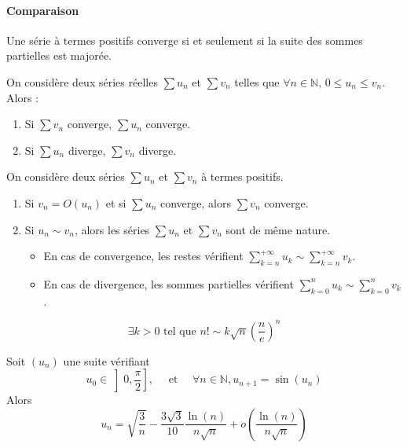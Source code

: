 	\paragraph{Comparaison}

	\begin{proposition}
		Une série à termes positifs converge si et seulement si la suite des sommes partielles est majorée.
	\end{proposition}

	\begin{corollary}
		On considère deux séries réelles $\sum u_n$ et $\sum v_n$ telles que $\forall n \in \mathbb{N}, \, 0 \leq u_n \leq v_n$. Alors :
		\begin{enumerate}[label=(\roman*)]
			\item Si $\sum v_n$ converge, $\sum u_n$ converge.
			\item Si $\sum u_n$ diverge, $\sum v_n$ diverge.
		\end{enumerate}
	\end{corollary}

	\begin{proposition}
		On considère deux séries $\sum u_n$ et $\sum v_n$ à termes positifs.
		\begin{enumerate}[label=(\roman*)]
			\item Si $v_n = O(u_n)$ et si $\sum u_n$ converge, alors $\sum v_n$ converge.
			\item Si $u_n \sim v_n$, alors les séries $\sum u_n$ et $\sum v_n$ sont de même nature.
			\begin{itemize}
				\item En cas de convergence, les restes vérifient $\sum_{k=n}^{+\infty} u_k \sim \sum_{k=n}^{+\infty} v_k$.
				\item En cas de divergence, les sommes partielles vérifient $\sum_{k=0}^{n} u_k \sim \sum_{k=0}^{n} v_k$.
			\end{itemize}
		\end{enumerate}
	\end{proposition}


	\begin{application}
		\[ \exists k > 0 \text{ tel que } n! \sim k \sqrt{n} \left( \frac{n}{e} \right)^n \]
	\end{application}


	\begin{application}
		Soit $(u_n)$ une suite vérifiant
		\[ u_0 \in \left] 0, \frac{\pi}{2} \right], \quad \text{ et } \quad \forall n \in \mathbb{N}, u_{n+1} = \sin(u_n) \]
		Alors
		\[ u_n = \sqrt{\frac{3}{n}} - \frac{3\sqrt{3}}{10} \frac{\ln(n)}{n\sqrt{n}} + o \left( \frac{\ln(n)}{n\sqrt{n}} \right) \]
	\end{application}

